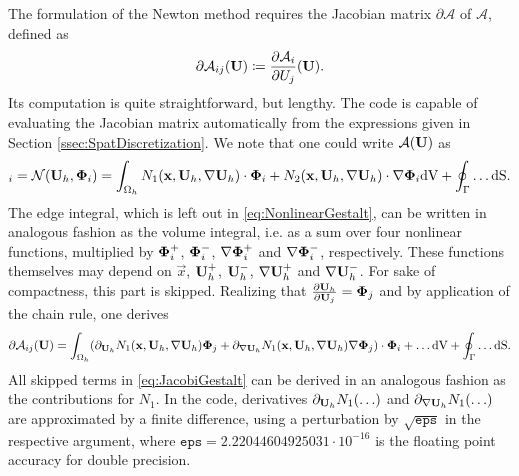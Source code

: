 The formulation of the Newton method requires the Jacobian matrix   $\partial \mathcal{A}$ of $\mathcal{A}$, defined as
\begin{equation}
\partial \mathcal{A}_{ij}(\textbf{U}) \coloneqq \frac{\partial \mathcal{A}_i}{\partial U_j}(\textbf{U}).
\label{Eq:Jacobian}
\end{equation}
Its computation is quite straightforward, but lengthy. The \BoSSS code is capable of evaluating the 
Jacobian matrix automatically from the expressions given in Section \ref{ssec:SpatDiscretization}.
We note that one could write $\mathcal{A}(\textbf{U})$ as
\begin{equation}
[\mathcal{A}(\myvector{U})]_i = \mathcal{N}( \myvector{U}_h , \gvec{\Phi}_i) =
\int_{\Omega_h} 
N_1 (\vec{x}, \myvector{U}_h , \nabla \myvector{U}_h  ) \cdot \gvec{\Phi}_i 
+ N_2 (\vec{x}, \myvector{U}_h , \nabla \myvector{U}_h  ) \cdot \nabla \gvec{\Phi}_i 
\textrm{dV}
+
\oint_{\Gamma} \ldots \mathrm{dS}.
\label{eq:NonlinearGestalt}
\end{equation}
The edge integral, which is left out in \cref{eq:NonlinearGestalt},
can be written in analogous fashion as the volume integral, i.e. as a sum over 
four nonlinear functions, multiplied by 
$ \boldsymbol{\Phi}_i^{+}$,  $\boldsymbol{\Phi}_i^{-}$, $ \nabla \boldsymbol{\Phi}_i^{+}$ and  $ \nabla \boldsymbol{\Phi}_i^{-}$,
respectively. 
These functions themselves may depend on 
$\vec{x}$, $\textbf{U}_h^{+}$,  $\textbf{U}_h^{-}$, $\nabla \textbf{U}_h^{+}$ and  $\nabla \textbf{U}_h^{-}$.
For sake of compactness, this part is skipped.
Realizing that $\frac{\partial \textbf{U}_h}{\partial \textbf{U}_j}  = \boldsymbol{\Phi}_j$ and by application of the 
chain rule, one derives
\begin{equation}
\partial \mathcal{A}_{ij}(\textbf{U}) =
\int_{\Omega_h} 
( \partial_{ \textbf{U}_h}       N_1 (\textbf{x}, \textbf{U}_h , \nabla \textbf{U}_h  ) \boldsymbol{\Phi}_j 
+   \partial_{\nabla \textbf{U}_h} N_1 (\textbf{x}, \textbf{U}_h , \nabla \textbf{U}_h  ) \nabla \boldsymbol{\Phi}_j ) \cdot \boldsymbol{\Phi}_i
+ \ldots
\textrm{dV}
+
\oint_{\Gamma} \ldots \mathrm{dS} .
\label{eq:JacobiGestalt}
\end{equation}
All skipped terms in \cref{eq:JacobiGestalt} can be derived in an analogous fashion as the contributions for $N_1$.
In the \BoSSS code, derivatives $ \partial_{ \textbf{U}_h} N_1 ( \ldots )$ and  $ \partial_{ \nabla \textbf{U}_h} N_1 ( \ldots )$
are approximated by a finite difference, using a perturbation by $\sqrt{\mathtt{eps}}$ in the respective argument,
where  $\mathtt{eps} = 2.22044604925031 \cdot 10^{-16}$ is the floating point accuracy for double precision.

